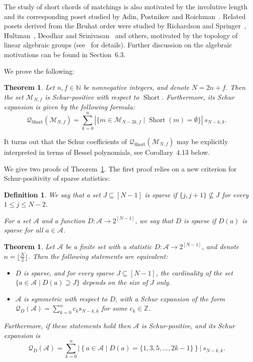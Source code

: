 \documentclass[11pt]{article}
\newtheorem{definition}[theo]{Definition}
\newtheorem{theorem}[theo]{Theorem}
\theoremstyle{definition}
\numberwithin{equation}{section}
\newcommand{\Short}{\operatorname{Short}}
\newcommand{\ZZ}{\mathbb{Z}}
\newcommand{\NN}{\mathbb{N}}
\newcommand{\Q}{\mathcal{Q}}
\newcommand{\A}{\mathcal{A}}
\newcommand{\M}{\mathcal{M}}
\begin{document}
The study of short chords of matchings is also motivated by the involutive length and its corresponding poset studied by Adin, Postnikov and Roichman~\cite{gelfand_involutions}. Related posets derived from the Bruhat order were studied by Richardson and Springer~\cite{richardson1990bruhat}, Hultman~\cite{hultman2008twisted}, Deodhar and Srinivasan~\cite{deodhar2001statistic} and others, motivated by the topology of linear algebraic groups (see~\cite{hultman2008twisted} for details). Further discussion on the algebraic motivations can be found in Section~6.3.




We prove the following:
\begin{theorem}
\label{thm:matchings schur positive}
    Let $n,f \in \NN$ be nonnegative integers, and denote $N=2n+f$. Then the set $\M_{N,f}$ is Schur-positive with respect to $\Short$. Furthermore, its Schur expansion is given by the following formula:
    \[
        \Q_{\Short} (\M_{N,f}) = \sum_{k=0}^n |\{ m\in \M_{N-2k,f} \mid \Short(m) = \emptyset\}|\ s_{N-k,k}.
    \]
\end{theorem}

It turns out  that the Schur coefficients of $\Q_{\Short} (\M_{N,f})$ 
may be explicitly interpreted in terms of Bessel polynomials, see 
Corollary~4.13 
below.




We give two proofs of Theorem~\ref{thm:matchings schur positive}. The first proof relies on a new criterion for Schur-positivity of sparse statistics:

\begin{definition}
\label{def:sparse}
    We say that a set $J \subseteq [N-1]$ is \emph{sparse} if $\{j,j+1\} \nsubseteq J$ for every $1 \le j \le N-2$.

    For a set $\A$ and a function $D:\A \to 2^{[N-1]}$, we say that $D$ is \emph{sparse} if $D(a)$ is sparse for all $a \in \A$.
\end{definition}

\begin{theorem}
\label{thm:criterion schur positive two rows}
    Let $\A$ be a finite set with a statistic $D:\A \to 2^{[N-1]}$, and denote $n = \lfloor\frac{N}{2} \rfloor$. Then the following statements are equivalent:
    \begin{itemize}
        \item $D$ is sparse, and for every sparse $J \subseteq [N-1]$, the cardinality of the set $\{a \in \A \mid D(a) \supseteq J\}$ depends on the size of $J$ only.
        \item $\A$ is symmetric with respect to $D$, with a Schur expansion of the form $\Q_{D}(\A) = \sum_{k=0}^n c_k s_{N-k,k}$ for some $c_k \in \ZZ$.
    \end{itemize}

    Furthermore, if these statements hold then $\A$ is Schur-positive, and its Schur expansion is
    \[
        \Q_{D} (\A) = \sum_{k=0}^n \left|\left\{ a\in \A \mid D(a) = \{1,3,5,\dots, 2k-1\} \right\}\right|\: s_{N-k,k}.
    \]
    
\end{theorem}
\end{document}

